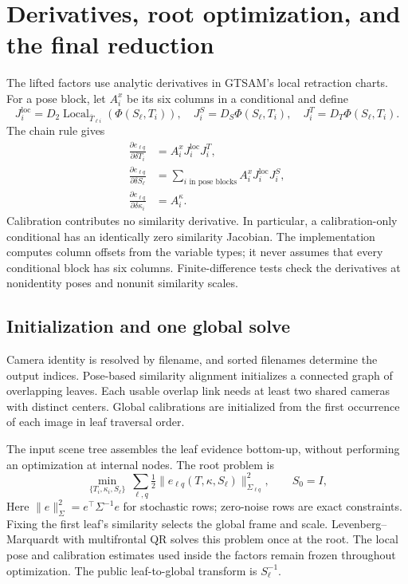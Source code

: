 \documentclass[11pt,letterpaper]{article}
\newcommand{\Local}{\operatorname{Local}}
\begin{document}
\newpage
\section{Derivatives, root optimization, and the final reduction}
The lifted factors use analytic derivatives in GTSAM's local retraction charts.
For a pose block, let $A_i^x$ be its six columns in a conditional and define
\begin{equation}
 J_i^{\mathrm{loc}}=D_2\Local_{\bar T_{\ell i}}(\Phi(S_\ell,T_i)),\quad
 J_i^S=D_S\Phi(S_\ell,T_i),\quad J_i^T=D_T\Phi(S_\ell,T_i).
\end{equation}
The chain rule gives
\begin{align}
 \frac{\partial e_{\ell q}}{\partial \delta T_i}
   &=A_i^xJ_i^{\mathrm{loc}}J_i^T,\\
 \frac{\partial e_{\ell q}}{\partial \delta S_\ell}
   &=\sum_{i\text{ in pose blocks}}A_i^xJ_i^{\mathrm{loc}}J_i^S,\\
 \frac{\partial e_{\ell q}}{\partial \delta\kappa_i}
   &=A_i^\kappa.
\end{align}
Calibration contributes no similarity derivative. In particular, a
calibration-only conditional has an identically zero similarity Jacobian.
The implementation computes column offsets from the variable types; it never
assumes that every conditional block has six columns. Finite-difference tests
check the derivatives at nonidentity poses and nonunit similarity scales.

\subsection{Initialization and one global solve}
Camera identity is resolved by filename, and sorted filenames determine the
output indices. Pose-based similarity alignment initializes a connected graph of
overlapping leaves. Each usable overlap link needs at least two shared cameras
with distinct centers. Global calibrations are initialized from the first
occurrence of each image in leaf traversal order.

The input scene tree assembles the leaf evidence bottom-up, without performing
an optimization at internal nodes. The root problem is
\begin{equation}\label{eq:root}
 \min_{\{T_i,\kappa_i,S_\ell\}}\ \sum_{\ell,q}
   \tfrac12\|e_{\ell q}(T,\kappa,S_\ell)\|_{\Sigma_{\ell q}}^2,
 \qquad S_0=I,
\end{equation}
Here $\|e\|_\Sigma^2=e^\top\Sigma^{-1}e$ for stochastic rows; zero-noise rows
are exact constraints. Fixing the first leaf's similarity selects the global frame and
scale. Levenberg--Marquardt with multifrontal QR solves this problem once at the
root. The local pose and calibration estimates used inside the factors remain
frozen throughout optimization. The public leaf-to-global transform is
$S_\ell^{-1}$.
\end{document}
